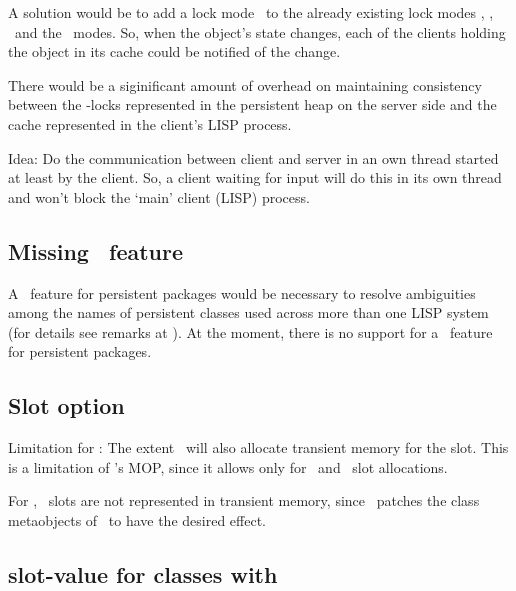 A solution would be to add a lock mode \ to the already
existing lock modes , , \ and
the \ modes. So, when the object's state changes,
each of the clients holding the object in its cache could be notified
of the change.

There would be a siginificant amount of overhead on maintaining
consistency between the -locks represented in the
persistent heap on the server side and the cache represented in the
client's LISP process.

Idea: Do the communication between client and server in an own thread
started at least by the client. So, a client waiting for input will do
this in its own thread and won't block the `main' client (LISP)
process.

\subsection[Missing `use-package' feature]{Missing
  \protect{}\ feature}%
\label{sec:MissingUsePackage}

A \ feature for persistent packages would be
necessary to resolve ambiguities among the names of persistent classes
used across more than one LISP system (for details see remarks at
). At the moment, there is no support for a
\ feature for persistent packages.

\subsection[Slot option :extent :persistent]{Slot option
  \protect{}\protect\lisp{\ %
    }\protect{}}

Limitation for \allegro: The extent \ will also
allocate transient memory for the slot.  This is a limitation of
\allegro's MOP, since it allows only for \ and
\ slot allocations.

For \lw, \ slots are not represented in
transient memory, since \plob\ patches the class metaobjects of \lw\ 
to have the desired effect.

\subsection[slot-value for classes with :metaclass
:persistent-metaclass]{slot-value for classes with
  \protect{}\protect\lisp{\ %
  }\protect{}}


